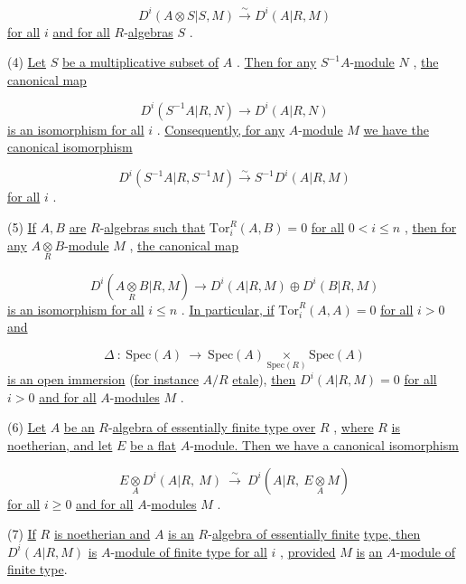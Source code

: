 $$D^i(A\otimes S|S, M) \xrightarrow{\sim} D^i(A|R, M)$$
\underline{for all}  $i$  \underline{and for all} $R$-\underline{algebras}  $S$  .

(4)  \underline{Let}  $S$  \underline{be a multiplicative subset of}  $A$  . \underline{Then for any}  $S^{-1}A$-\underline{module} $N$  , \underline{the canonical map}

$$D^i(S^{-1}A|R, N) \to D^i(A|R, N)$$
\underline{is an isomorphism for all}  $i$  . \underline{Consequently, for any} $A$-\underline{module}  $M$  \underline{we have the} \underline{canonical isomorphism}

$$D^i(S^{-1}A|R, S^{-1}M) \xrightarrow{\sim} S^{-1}D^i(A|R, M)$$
\underline{for all}  $i$  .

(5)  \underline{If}  $A, B$  \underline{are} $R$-\underline{algebras such that}  $\mathrm{Tor}_i^R(A, B) = 0$  \underline{for all} $0 < i \leq n$  , \underline{then for any}  $A\underset{R}{\otimes}B$-\underline{module}  $M$  , \underline{the canonical map}

$$D^i(A\underset{R}{\otimes}B|R, M) \to D^i(A|R, M) \oplus D^i(B|R, M)$$
\underline{is an isomorphism for all}  $i \leq n$  . \underline{In particular, if}  $\mathrm{Tor}_i^R(A, A) = 0$  \underline{for all}
$i > 0$  \underline{and}

\begin{equation*}
\Delta \ : \ \mathrm{Spec}(A) \ \to \ \mathrm{Spec}(A) \underset{\mathrm{Spec}(R)}{\times} \mathrm{Spec}(A)
\end{equation*}
\underline{is an open immersion} (\underline{for instance}  $A/R$  \underline{etale}), \underline{then}  $D^i(A|R, M) = 0$  \underline{for all} $i > 0$  \underline{and for all} $A$-\underline{modules}  $M$ .

(6) \underline{Let}  $A$  \underline{be an} $R$-\underline{algebra of essentially finite type over}  $R$ , \underline{where} $R$  \underline{is noetherian, and let}  $E$  \underline{be a flat} $A$-\underline{module. Then we have a canonical isomorphism}

\begin{equation*}
E \underset{A}{\otimes} D^i(A|R, \ M) \ \overset{\sim}{\longrightarrow} \ D^i(A|R, \ E \underset{A}{\otimes} M)
\end{equation*}
\underline{for all}  $i \geq 0$  \underline{and for all} $A$-\underline{modules}  $M$ .

(7) \underline{If}  $R$  \underline{is noetherian and}  $A$  \underline{is an} $R$-\underline{algebra of essentially finite} \underline{type, then}  $D^i(A|R, M)$  \underline{is} $A$-\underline{module of finite type for all}  $i$ , \underline{provided}  $M$  \underline{is} \underline{an} $A$-\underline{module of finite type}.

